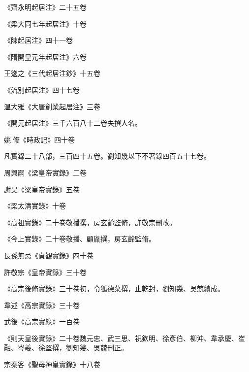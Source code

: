 \begin{pinyinscope}
 《齊永明起居注》二十五卷



 《梁大同七年起居注》十卷



 《陳起居注》四十一卷



 《隋開皇元年起居注》六卷



 王逡之《三代起居注鈔》十五卷



 《流別起居注》四十七卷



 溫大雅《大唐創業起居注》三卷



 《開元起居注》三千六百八十二卷失撰人名。



 姚修《時政記》四十卷



 凡實錄二十八部，三百四十五卷。劉知幾以下不著錄四百五十七卷。



 周興嗣《梁皇帝實錄》二卷



 謝昊《梁皇帝實錄》五卷



 《梁太清實錄》十卷



 《高祖實錄》二十卷敬播撰，房玄齡監脩，許敬宗刪改。



 《今上實錄》二十卷敬播、顧胤撰，房玄齡監脩。



 長孫無忌《貞觀實錄》四十卷



 許敬宗《皇帝實錄》三十卷



 《高宗後脩實錄》三十卷初，令狐德棻撰，止乾封，劉知幾、吳兢續成。



 韋述《高宗實錄》三十卷



 武後《高宗實綠》一百卷



 《則天皇後實錄》二十卷魏元忠、武三思、祝欽明、徐彥伯、柳沖、韋承慶、崔融、岑羲、徐堅撰，劉知幾、吳兢刪正。



 宗秦客《聖母神皇實錄》十八卷




\end{pinyinscope}
